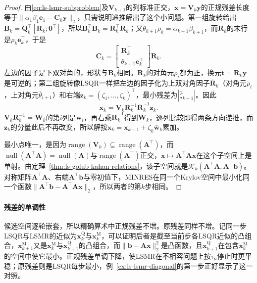 \begin{proof}
由\eqref{eq:ls-lsmr-subproblem}及$\bm V_{k+1}$的列标准正交，$\bm x=\bm V_k\bm y$的正规残差长度等于$\lVert\alpha_1\beta_1\bm e_1-\bm C_k\bm y\rVert_2$，只需说明递推解出了这个小问题。第一组旋转给出$\bm B_k=\bm Q_k^\top[\bm R_k;\bm0^\top]$，所以$\bm B_k^\top\bm B_k=\bm R_k^\top\bm R_k$；又$\theta_{k+1}\rho_k=\alpha_{k+1}\beta_{k+1}$，而$\bm R_k$的末行是$\rho_k\bm e_k^\top$，于是
\[
 \bm C_k=\begin{bmatrix}\bm R_k^\top\\ \theta_{k+1}\bm e_k^\top\end{bmatrix}\bm R_k .
\]
左边的因子是下双对角的，形状与$\bm B_k$相同。$\bm R_k$的对角元$\rho_i$都为正，换元$\bm t=\bm R_k\bm y$是可逆的；第二组旋转像LSQR一样把左边的因子化为上双对角因子$\bar{\bm R}_k$（对角元$\bar\rho_i$，上对角元$\bar\theta_{i+1}$）和右端$\bm z_k=(\zeta_1,\ldots,\zeta_k)^\top$，最小残差为$|\bar\zeta_{k+1}|$。因此
\[
 \bm x_k=\bm V_k\bm R_k^{-1}\bar{\bm R}_k^{-1}\bm z_k .
\]
$\bm V_k\bm R_k^{-1}=\bm W_k$的第$i$列是$\bm w_i$，再右乘$\bar{\bm R}_k^{-1}$得到$\bar{\bm W}_k$，逐列比较即得两条方向递推，而$\bm z_k$的分量此后不再改变，所以解按$\bm x_k=\bm x_{k-1}+\zeta_k\bar{\bm w}_k$累加。

最小点唯一，是因为$\operatorname{range}(\bm V_k)\subseteq\operatorname{range}(\bm A^\top)$，而$\operatorname{null}(\bm A^\top\bm A)=\operatorname{null}(\bm A)$与$\operatorname{range}(\bm A^\top)$正交，$\bm x\mapsto\bm A^\top\bm A\bm x$在这个子空间上是单射。由定理~\ref{thm:ls-golub-kahan-relations}，该子空间就是$\mathcal K_k(\bm A^\top\bm A,\bm A^\top\bm b)$。对称矩阵$\bm A^\top\bm A$、右端$\bm A^\top\bm b$与零初值下，MINRES在同一个Krylov空间中最小化同一个函数$\lVert\bm A^\top\bm b-\bm A^\top\bm A\bm x\rVert_2$，所以两者的第$k$步相同。
\end{proof}

\paragraph{残差的单调性}
候选空间逐轮嵌套，所以精确算术中正规残差不增。原残差同样不增。记同一步LSQR与LSMR的近似为$\bm x_k^{\mathrm Q}$与$\bm x_k^{\mathrm M}$，可以证明后者是截至当前步各LSQR近似的凸组合，$\bm x_{k+1}^{\mathrm M}$又是$\bm x_k^{\mathrm M}$与$\bm x_{k+1}^{\mathrm Q}$的凸组合，而$\lVert\bm b-\bm A\bm x\rVert_2^2$是凸函数，且$\bm x_{k+1}^{\mathrm Q}$在包含$\bm x_k^{\mathrm M}$的空间中使它最小。正规残差单调下降，使LSMR在不相容问题上按$\tau_n$停止时更平稳；原残差则是LSQR每步最小，例~\ref{ex:ls-lsmr-diagonal}的第一步正好显示了这一对照。

